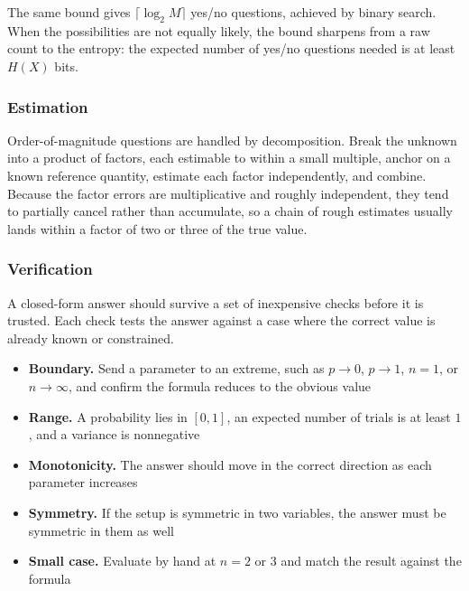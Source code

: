 The same bound gives $\lceil \log_2 M \rceil$ yes/no questions, achieved by binary search. When the possibilities are not equally likely, the bound sharpens from a raw count to the entropy: the expected number of yes/no questions needed is at least $H(X)$ bits.

\subsubsection{Estimation}

Order-of-magnitude questions are handled by decomposition. Break the unknown into a product of factors, each estimable to within a small multiple, anchor on a known reference quantity, estimate each factor independently, and combine. Because the factor errors are multiplicative and roughly independent, they tend to partially cancel rather than accumulate, so a chain of rough estimates usually lands within a factor of two or three of the true value.

\subsubsection{Verification}

A closed-form answer should survive a set of inexpensive checks before it is trusted. Each check tests the answer against a case where the correct value is already known or constrained.

\vspace{1.5ex}

\begin{keybox}
\begin{itemize}[itemsep=1ex, label=--]
  \item \textbf{Boundary.} Send a parameter to an extreme, such as $p \to 0$, $p \to 1$, $n = 1$, or $n \to \infty$, and confirm the formula reduces to the obvious value
  \item \textbf{Range.} A probability lies in $[0,1]$, an expected number of trials is at least $1$, and a variance is nonnegative
  \item \textbf{Monotonicity.} The answer should move in the correct direction as each parameter increases
  \item \textbf{Symmetry.} If the setup is symmetric in two variables, the answer must be symmetric in them as well
  \item \textbf{Small case.} Evaluate by hand at $n = 2$ or $3$ and match the result against the formula
\end{itemize}
\end{keybox}
